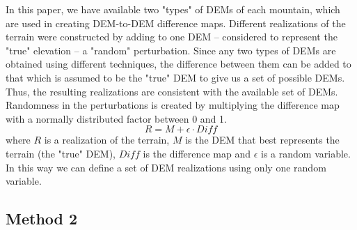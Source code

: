 \documentclass[12pt]{article}
\begin{document}
In this paper, we have available two "types" of DEMs of each mountain,
which are used in creating DEM-to-DEM difference maps.  Different
realizations of the terrain were constructed by adding to one DEM --
considered to represent the "true" elevation -- a "random"
perturbation.  Since any two types of DEMs are obtained using
different techniques, the difference between them can be added to that
which is assumed to be the "true" DEM to give us a set of possible
DEMs. Thus, the resulting realizations are consistent with the
available set of DEMs. Randomness in the perturbations is created by
multiplying the difference map with a normally distributed factor
between 0 and 1.
\begin{equation}
R = M + \epsilon \cdot Diff
\label{eq:two}
\end{equation}
where $R$ is a realization of the terrain, $M$ is the DEM that best
represents the terrain (the "true" DEM), $Diff$ is the difference map
and $\epsilon$ is a random variable.  In this way we can define a set
of DEM realizations using only one random variable.

\subsection{Method 2}
\label{Method2}
\end{document}

